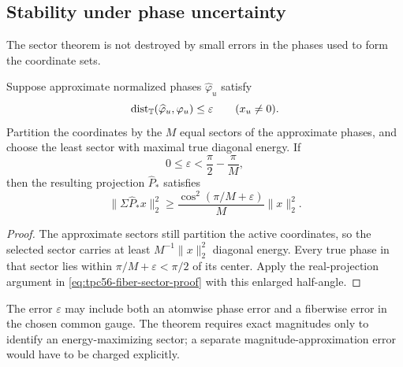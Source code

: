 \subsection{Stability under phase uncertainty}

The sector theorem is not destroyed by small errors in the phases used to
form the coordinate sets.

\begin{theorem}
\label{thm:tpc56-phase-error-stability}
Suppose approximate normalized phases \(\widehat\varphi_u\) satisfy
\begin{equation}
 \operatorname{dist}_{\mathbb T}(\widehat\varphi_u,\varphi_u)\le\varepsilon
 \qquad(x_u\ne0).
 \label{eq:tpc56-phase-error-hypothesis}
\end{equation}
Partition the coordinates by the \(M\) equal sectors of the approximate
phases, and choose the least sector with maximal true diagonal energy.
If
\begin{equation}
 0\le\varepsilon<\frac\pi2-\frac\pi M,
 \label{eq:tpc56-phase-error-range}
\end{equation}
then the resulting projection \(\widehat P_*\) satisfies
\begin{equation}
 \boxed{
 \|\Sigma\widehat P_*x\|_2^2
 \ge
 \frac{\cos^2(\pi/M+\varepsilon)}M\|x\|_2^2.}
 \label{eq:tpc56-phase-error-lower}
\end{equation}
\end{theorem}

\begin{proof}
The approximate sectors still partition the active coordinates, so the
selected sector carries at least \(M^{-1}\|x\|_2^2\) diagonal energy.
Every true phase in that sector lies within
\(\pi/M+\varepsilon<\pi/2\) of its center.  Apply the real-projection
argument in \eqref{eq:tpc56-fiber-sector-proof} with this enlarged
half-angle.
\end{proof}

The error \(\varepsilon\) may include both an atomwise phase error and a
fiberwise error in the chosen common gauge.  The theorem requires exact
magnitudes only to identify an energy-maximizing sector; a separate
magnitude-approximation error would have to be charged explicitly.
